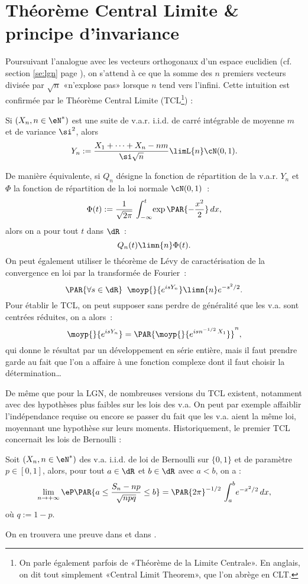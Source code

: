 %
\section{Théorème Central Limite \& principe d'invariance}\label{se:tcl}
%

Poursuivant l'analogue avec les vecteurs orthogonaux d'un espace euclidien
(cf. section \ref{se:lgn} page \pageref{se:lgn}), on s'attend à ce que la
somme des $n$ premiers vecteurs divisée par $\sqrt{n}$ «n'explose pas» lorsque
$n$ tend vers l'infini. Cette intuition est confirmée par le Théorème Central
Limite (TCL\footnote{On parle également parfois de «Théorème de la Limite
  Centrale».  En anglais, on dit tout simplement «Central Limit Theorem», que
  l'on abrège en CLT.}) :
\begin{theorem}
  Si $(X_n,n\in\eN^*)$ est une suite de v.a.r. i.i.d. de carré intégrable de
  moyenne $m$ et de variance $\si^2$, alors
  $$Y_n:=\frac{X_1+\cdots+X_n-nm}{\si\sqrt{n}}\limL{n}\cN(0,1).$$
\end{theorem}
De manière équivalente, si $Q_n$ désigne la fonction de répartition de la
v.a.r. $Y_n$ et $\Phi$ la fonction de répartition de la loi normale $\cN(0,1)$~:
$$
\Phi(t):=\frac{1}{\sqrt{2\pi}}\,\int_{-\infty}^t\!\exp\PAR{-\frac{x^2}{2}}\,dx,
$$
alors on a pour tout $t$ dans $\dR$~:
$$
Q_n(t)\limn{n}\Phi(t).
$$
On peut également utiliser le théorème de Lévy de caractérisation de la
convergence en loi par la transformée de Fourier~:
$$
\PAR{\forall s\in\dR}\;\; \moyp{}{e^{isY_n}} \limn{n} e^{-s^2/2}.
$$
Pour établir le TCL, on peut supposer sans perdre de généralité que les
v.a. sont centrées réduites, on a alors~:
$$
\moyp{}{e^{isY_n}}=\PAR{\moyp{}{e^{isn^{-1/2}\,X_1}}}^n,
$$
qui donne le résultat par un développement en série entière, mais il faut
prendre garde au fait que l'on a affaire à une fonction complexe dont il faut
choisir la détermination\ldots

De même que pour la LGN, de nombreuses versions du TCL existent, notamment
avec des hypothèses plus faibles sur les lois des v.a. On peut par exemple
affaiblir l'indépendance requise ou encore se passer du fait que les v.a.
aient la même loi, moyennant une hypothèse sur leurs moments. Historiquement,
le premier TCL concernait les lois de Bernoulli :

\begin{theorem}\label{th:moivre-laplace}
  Soit $(X_n,n\in\eN^*)$ des v.a. i.i.d. de loi de Bernoulli sur $\{0,1\}$ et
  de paramètre $p\in[0,1]$, alors, pour tout $a\in\dR$ et $b\in\dR$ avec
  $a<b$, on a :
  $$
  \lim_{n\to+\infty}
  \eP\PAR{a\leq \frac{S_n-np}{\sqrt{npq}}\leq b} 
    =\PAR{2\pi}^{-1/2}\,\int_a^b\!e^{-x^2/2}\,dx,
  $$
  où $q:=1-p$.
\end{theorem}
On en trouvera une preuve dans \cite[cor. 8.9]{applebaum} et dans
\cite[expl. V.5.5(i) pages 145-146]{barbe-ledoux}. 


